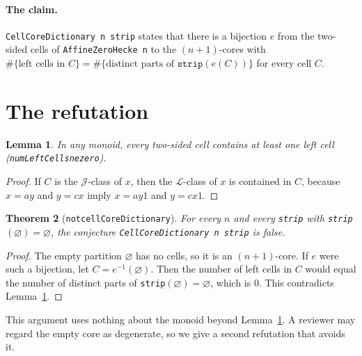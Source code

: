 \documentclass[11pt]{article}
\newtheorem{theorem}{Theorem}
\newtheorem{lemma}[theorem]{Lemma}
\theoremstyle{definition}
\theoremstyle{remark}
\renewcommand{\_}{\oldus\allowbreak}
\begin{document}
\paragraph{The claim.} \texttt{CellCoreDictionary n strip} states that there is a bijection
$e$ from the two-sided cells of \texttt{AffineZeroHecke n} to the $(n+1)$-cores with
$\#\{\text{left cells in }C\}=\#\{\text{distinct parts of }\texttt{strip}(e(C))\}$ for every cell $C$.

\section{The refutation}

\begin{lemma}\label{lem:nonzero}
In any monoid, every two-sided cell contains at least one left cell (\texttt{numLeftCells\_ne\_zero}).
\end{lemma}
\begin{proof}
If $C$ is the $\mathcal J$-class of $x$, then the $\mathcal L$-class of $x$ is contained in $C$, because
$x=ay$ and $y=cx$ imply $x=ay1$ and $y=cx1$.
\end{proof}

\begin{theorem}[\texttt{not\_cellCoreDictionary}]\label{thm:main}
For every $n$ and every \texttt{strip} with \texttt{strip}$(\varnothing)=\varnothing$, the conjecture
\texttt{CellCoreDictionary n strip} is false.
\end{theorem}
\begin{proof}
The empty partition $\varnothing$ has no cells, so it is an $(n+1)$-core. If $e$ were such a bijection,
let $C=e^{-1}(\varnothing)$. Then the number of left cells in $C$ would equal the number of distinct parts of
\texttt{strip}$(\varnothing)=\varnothing$, which is $0$. This contradicts Lemma~\ref{lem:nonzero}.
\end{proof}

This argument uses nothing about the monoid beyond Lemma~\ref{lem:nonzero}. A reviewer may regard the
empty core as degenerate, so we give a second refutation that avoids it.
\end{document}
